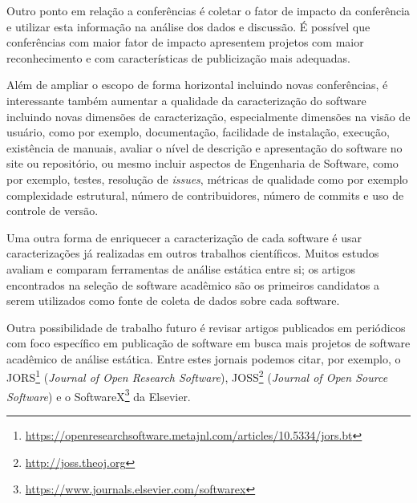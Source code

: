 

Outro ponto em relação a conferências é coletar o fator de impacto da
conferência e utilizar esta informação na análise dos dados e discussão. É
possível que conferências com maior fator de impacto apresentem projetos com
maior reconhecimento e com características de publicização mais adequadas.

Além de ampliar o escopo de forma horizontal incluindo novas conferências, é
interessante também aumentar a qualidade da caracterização do software
incluindo novas dimensões de caracterização, especialmente dimensões na visão
de usuário, como por exemplo, documentação, facilidade de instalação, execução,
existência de manuais, avaliar o nível de descrição e apresentação do software
no site ou repositório, ou mesmo incluir aspectos de Engenharia de Software,
como por exemplo, testes, resolução de {\it issues}, métricas de qualidade como
por exemplo complexidade estrutural, número de contribuidores, número de
commits e uso de controle de versão.


Uma outra forma de enriquecer a caracterização de cada software é usar
caracterizações já realizadas em outros trabalhos científicos. Muitos estudos
avaliam e comparam ferramentas de análise estática entre si; os artigos
encontrados na seleção de software acadêmico são os primeiros candidatos a
serem utilizados como fonte de coleta de dados sobre cada software.



Outra possibilidade de trabalho futuro é revisar artigos publicados em periódicos
com foco específico em publicação de software em busca mais projetos de
software acadêmico de análise estática. Entre estes jornais podemos citar, por
exemplo, o JORS\footnote{\url{https://openresearchsoftware.metajnl.com/articles/10.5334/jors.bt}} ({\it Journal of Open Research
Software}),
JOSS\footnote{\url{http://joss.theoj.org}} ({\it Journal of Open Source Software}) \cite{smith2017journal} e
o SoftwareX\footnote{\url{https://www.journals.elsevier.com/softwarex}} da
Elsevier.

%
%
